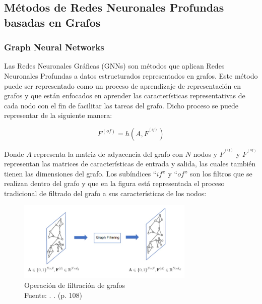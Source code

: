 \subsection{Métodos de Redes Neuronales Profundas basadas en Grafos}
\subsubsection{Graph Neural Networks \parencite{bk_grafo}}

Las Redes Neuronales Gráficas (GNNs) son métodos que aplican Redes Neuronales Profundas a datos estructurados representados en grafos. Este método puede ser representado como un proceso de aprendizaje de representación en grafos y que están enfocados en aprender las características representativas de cada nodo con el fin de facilitar las tareas del grafo. Dicho proceso se puede representar de la siguiente manera:


\begin{equation}
	F^{(of)}= h(A,F^{^{(if)}})
\end{equation}

Donde $A$ representa la matriz de adyacencia del grafo con $N$ nodos y $F^{^{(if)}}$ y $F^{^{(of)}}$ representan las matrices de características de entrada y salida, las cuales también tienen las dimensiones  del grafo. Los subíndices “$if$” y “$of$” son los filtros que se realizan dentro del grafo y que en la figura está representada el proceso tradicional de filtrado del grafo a sus características de los nodos:

\begin{figure}[h]
	\begin{center}
		\includegraphics[width=0.75\textwidth]{2/MT/7.jpg}
		\caption{Operación de filtración de grafos \\
			Fuente: \citep*{bk_grafo}. . (p. 108)}
		\label{1:fig2}
	\end{center}
\end{figure}


